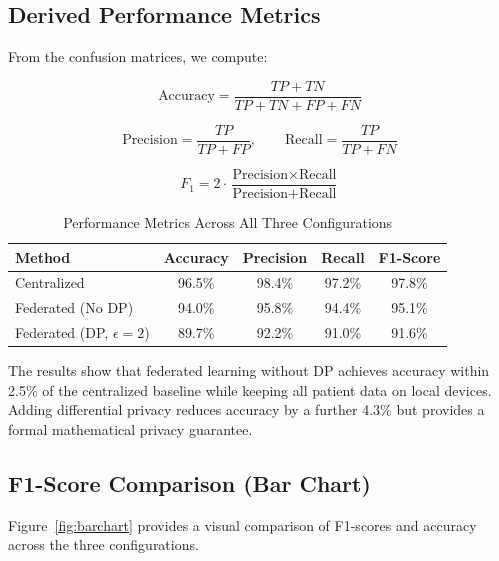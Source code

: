 \documentclass[conference]{IEEEtran}
\begin{document}
\subsection{Derived Performance Metrics}

From the confusion matrices, we compute:

\begin{equation}
\text{Accuracy} = \frac{TP + TN}{TP + TN + FP + FN}
\end{equation}

\begin{equation}
\text{Precision} = \frac{TP}{TP + FP}, \qquad
\text{Recall} = \frac{TP}{TP + FN}
\end{equation}

\begin{equation}
F_1 = 2 \cdot \frac{\text{Precision} \times \text{Recall}}{\text{Precision} + \text{Recall}}
\end{equation}

\begin{table}[H]
\centering
\caption{Performance Metrics Across All Three Configurations}
\label{tab:metrics}
\renewcommand{\arraystretch}{1.3}
\begin{tabular}{|l|c|c|c|c|}
\hline
\textbf{Method} & \textbf{Accuracy} & \textbf{Precision} & \textbf{Recall} & \textbf{F1-Score} \\
\hline
Centralized          & 96.5\% & 98.4\% & 97.2\% & 97.8\% \\
Federated (No DP)    & 94.0\% & 95.8\% & 94.4\% & 95.1\% \\
Federated (DP, $\epsilon=2$) & 89.7\% & 92.2\% & 91.0\% & 91.6\% \\
\hline
\end{tabular}
\end{table}

The results show that federated learning without DP achieves accuracy within 2.5\% of the centralized baseline while keeping all patient data on local devices. Adding differential privacy reduces accuracy by a further 4.3\% but provides a formal mathematical privacy guarantee.

\subsection{F1-Score Comparison (Bar Chart)}

Figure~\ref{fig:barchart} provides a visual comparison of F1-scores and accuracy across the three configurations.
\end{document}
